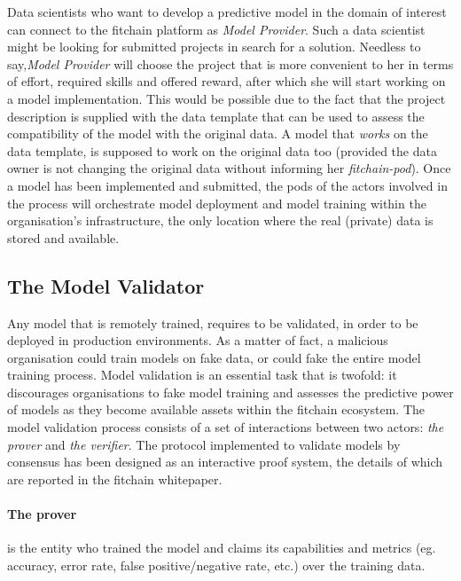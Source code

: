 \documentclass[12pt, a4paper,titlepage]{extreport}
\begin{document}
Data scientists who want to develop a predictive model in the domain of interest can connect to the fitchain platform as \emph{Model Provider}. Such a data scientist might be looking for submitted projects in search for a solution. Needless to say,\emph{Model Provider} will choose the project that is more convenient to her in terms of effort, required skills and offered reward, after which she will start working on a model implementation. This would be possible due to the fact that the project description is supplied with the data template that can be used to assess the compatibility of the model with the original data. A model that \textit{works} on the data template, is supposed to work on the original data too (provided the data owner is not changing the original data without informing her \textit{fitchain-pod}).
Once a model has been implemented and submitted, the pods of the actors involved in the process will orchestrate model deployment and model training within the organisation's infrastructure, the only location where the real (private) data is stored and available. %
 
\subsection{The Model Validator}
Any model that is remotely trained, requires to be validated, in order to be deployed in production environments. As a matter of fact, a malicious organisation could train models on fake data, or could fake the entire model training process. 
Model validation is an essential task that is twofold: it discourages organisations to fake model training and assesses the predictive power of models as they become available assets within the fitchain ecosystem.
The model validation process consists of a set of interactions between two actors: \textit{the prover} and \textit{the verifier}. The protocol implemented to validate models by consensus has been designed as an interactive proof system, the details of which are reported in the fitchain whitepaper.

\paragraph{The prover} is the entity who trained the model and claims its capabilities and metrics (eg. accuracy, error rate, false positive/negative rate, etc.) over the training data. 
\end{document}
